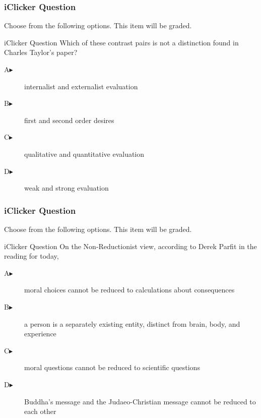 \documentclass[xcolor=dvipsnames]{beamer}
\begin{document}
\begin{frame}
  \frametitle{iClicker Question}
Choose from the following options. This item will be graded.
\begin{block}{iClicker Question}
Which of these contrast pairs is not a distinction found in Charles
Taylor's paper?
\end{block}
\begin{description}
\item[A\hspace{.2in}$\blacktriangleright$] internalist and externalist evaluation
\item[B\hspace{.2in}$\blacktriangleright$] first and second order desires
\item[C\hspace{.2in}$\blacktriangleright$] qualitative and quantitative evaluation
\item[D\hspace{.2in}$\blacktriangleright$] weak and strong evaluation
\end{description}
\end{frame}

\begin{frame}
  \frametitle{iClicker Question}
Choose from the following options. This item will be graded.
\begin{block}{iClicker Question}
On the Non-Reductionist view, according to Derek Parfit in the reading for today,
\end{block}
\begin{description}
\item[A\hspace{.2in}$\blacktriangleright$] moral choices cannot be reduced to calculations about consequences
\item[B\hspace{.2in}$\blacktriangleright$] a person is a separately existing entity, distinct from brain, body, and experience
\item[C\hspace{.2in}$\blacktriangleright$] moral questions cannot be reduced to scientific questions
\item[D\hspace{.2in}$\blacktriangleright$] Buddha's message and the Judaeo-Christian message cannot be reduced to each other
\end{description}
\end{frame}
\end{document}
